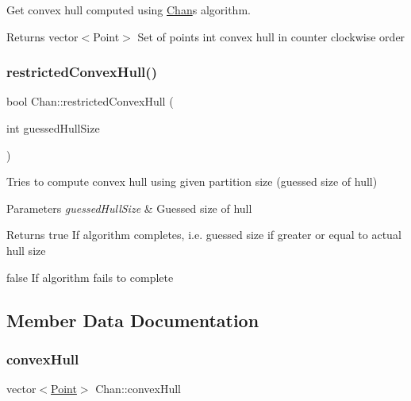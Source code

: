 Get convex hull computed using \mbox{\hyperlink{classChan}{Chan}}\textquotesingle{}s algorithm. 

\begin{DoxyReturn}{Returns}
vector$<$\+Point$>$ Set of points int convex hull in counter clockwise order 
\end{DoxyReturn}
\mbox{\label{classChan_a3a7eb4017718654b6f7f13daaef90534}} 
\subsubsection{\texorpdfstring{restricted\+Convex\+Hull()}{restrictedConvexHull()}}
{\footnotesize\ttfamily bool Chan\+::restricted\+Convex\+Hull (\begin{DoxyParamCaption}\item[{int}]{guessed\+Hull\+Size }\end{DoxyParamCaption})\hspace{0.3cm}{\ttfamily [private]}}



Tries to compute convex hull using given partition size (guessed size of hull) 


\begin{DoxyParams}{Parameters}
{\em guessed\+Hull\+Size} & Guessed size of hull \\
\hline
\end{DoxyParams}
\begin{DoxyReturn}{Returns}
true If algorithm completes, i.\+e. guessed size if greater or equal to actual hull size 

false If algorithm fails to complete 
\end{DoxyReturn}


\subsection{Member Data Documentation}
\mbox{\label{classChan_a983333f17209e944e2218f83c6db04a8}} 
\subsubsection{\texorpdfstring{convex\+Hull}{convexHull}}
{\footnotesize\ttfamily vector$<$\mbox{\hyperlink{classPoint}{Point}}$>$ Chan\+::convex\+Hull\hspace{0.3cm}{\ttfamily [private]}}



